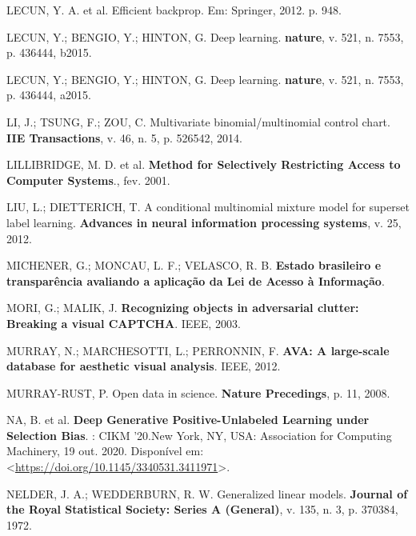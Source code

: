 \documentclass[12pt,twoside,brazilian]{book}
\newlength{\cslhangindent}
\newlength{\cslentryspacingunit} %
\newenvironment{CSLReferences}[2] %
 {%
  \setlength{\parindent}{0pt}
  \ifodd #1
  \let\oldpar\par
  \def\par{\hangindent=\cslhangindent\oldpar}
  \fi
  \setlength{\parskip}{#2\cslentryspacingunit}
 }%
 {}
\begin{document}
\begin{CSLReferences}{0}{1}
\leavevmode{}%
LECUN, Y. A. et al. Efficient backprop. Em: Springer, 2012. p. 948.

\leavevmode{}%
LECUN, Y.; BENGIO, Y.; HINTON, G. Deep learning. \textbf{nature}, v.
521, n. 7553, p. 436444, b2015.

\leavevmode{}%
LECUN, Y.; BENGIO, Y.; HINTON, G. Deep learning. \textbf{nature}, v.
521, n. 7553, p. 436444, a2015.

\leavevmode{}%
LI, J.; TSUNG, F.; ZOU, C. Multivariate binomial/multinomial control
chart. \textbf{IIE Transactions}, v. 46, n. 5, p. 526542, 2014.

\leavevmode{}%
LILLIBRIDGE, M. D. et al. \textbf{Method for Selectively Restricting
Access to Computer Systems}., fev. 2001.

\leavevmode{}%
LIU, L.; DIETTERICH, T. A conditional multinomial mixture model for
superset label learning. \textbf{Advances in neural information
processing systems}, v. 25, 2012.

\leavevmode{}%
MICHENER, G.; MONCAU, L. F.; VELASCO, R. B. \textbf{Estado brasileiro e
transparência avaliando a aplicação da Lei de Acesso à Informação}.

\leavevmode{}%
MORI, G.; MALIK, J. \textbf{Recognizing objects in adversarial clutter:
Breaking a visual CAPTCHA}. IEEE, 2003.

\leavevmode{}%
MURRAY, N.; MARCHESOTTI, L.; PERRONNIN, F. \textbf{AVA: A large-scale
database for aesthetic visual analysis}. IEEE, 2012.

\leavevmode{}%
MURRAY-RUST, P. Open data in science. \textbf{Nature Precedings}, p. 11,
2008.

\leavevmode{}%
NA, B. et al. \textbf{Deep Generative Positive-Unlabeled Learning under
Selection Bias}. : CIKM '20.New York, NY, USA: Association for Computing
Machinery, 19 out. 2020. Disponível em:
\textless{}\url{https://doi.org/10.1145/3340531.3411971}\textgreater.

\leavevmode{}%
NELDER, J. A.; WEDDERBURN, R. W. Generalized linear models.
\textbf{Journal of the Royal Statistical Society: Series A (General)},
v. 135, n. 3, p. 370384, 1972.


\end{CSLReferences}
\end{document}
